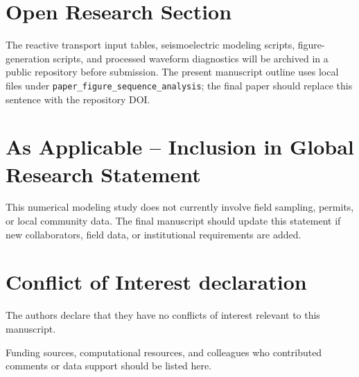 \documentclass[draft]{agujournal2019}
\begin{document}
%
%

\section*{Open Research Section}
The reactive transport input tables, seismoelectric modeling scripts, figure-generation scripts, and processed waveform diagnostics will be archived in a public repository before submission.
The present manuscript outline uses local files under \texttt{paper\_figure\_sequence\_analysis}; the final paper should replace this sentence with the repository DOI.

\section*{As Applicable – Inclusion in Global Research Statement}
This numerical modeling study does not currently involve field sampling, permits, or local community data.
The final manuscript should update this statement if new collaborators, field data, or institutional requirements are added.

\section*{Conflict of Interest declaration}
The authors declare that they have no conflicts of interest relevant to this manuscript.


\acknowledgments
Funding sources, computational resources, and colleagues who contributed comments or data support should be listed here.


%
%

%



%
%
%
%
%
\end{document}
